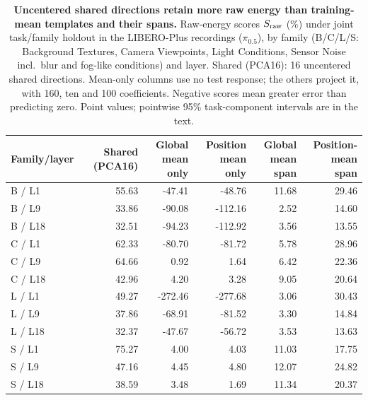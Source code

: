 \begin{table}[t]
\caption{\textbf{Uncentered shared directions retain more raw energy than training-mean templates and their spans.} Raw-energy scores $S_{\rm raw}$ (\%) under joint task/family holdout in the LIBERO-Plus recordings ($\pi_{0.5}$), by family (B/C/L/S: Background Textures, Camera Viewpoints, Light Conditions, Sensor Noise incl.\ blur and fog-like conditions) and layer. Shared (PCA16): 16 uncentered shared directions. Mean-only columns use no test response; the others project it, with 160, ten and 100 coefficients. Negative scores mean greater error than predicting zero. Point values; pointwise 95\% task-component intervals are in the text.}

\centering\small
\setlength{\tabcolsep}{7pt}
\begin{tabular}{lrrrrr}
\toprule
Family/layer & Shared (PCA16) & \shortstack{Global mean\\only} & \shortstack{Position mean\\only} & \shortstack{Global mean\\span} & \shortstack{Position-mean\\span}\\
\midrule
B / L1 & 55.63 & -47.41 & -48.76 & 11.68 & 29.46\\
B / L9 & 33.86 & -90.08 & -112.16 & 2.52 & 14.60\\
B / L18 & 32.51 & -94.23 & -112.92 & 3.56 & 13.55\\
C / L1 & 62.33 & -80.70 & -81.72 & 5.78 & 28.96\\
C / L9 & 64.66 & 0.92 & 1.64 & 6.42 & 22.36\\
C / L18 & 42.96 & 4.20 & 3.28 & 9.05 & 20.64\\
L / L1 & 49.27 & -272.46 & -277.68 & 3.06 & 30.43\\
L / L9 & 37.86 & -68.91 & -81.52 & 3.30 & 14.84\\
L / L18 & 32.37 & -47.67 & -56.72 & 3.53 & 13.63\\
S / L1 & 75.27 & 4.00 & 4.03 & 11.03 & 17.75\\
S / L9 & 47.16 & 4.45 & 4.80 & 12.07 & 24.82\\
S / L18 & 38.59 & 3.48 & 1.69 & 11.34 & 20.37\\
\bottomrule
\end{tabular}

\label{tab:mean-controls}
\end{table}

